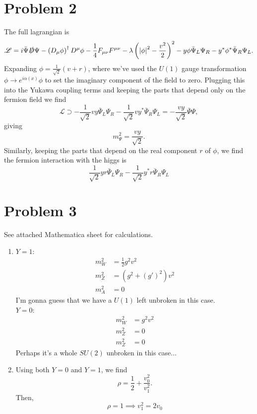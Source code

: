 \documentclass[12pt]{article}
\begin{document}
\section*{Problem 2}
The full lagrangian is
\[ \mathscr{L} = i\bar{\Psi}\slashed{D}\Psi - \left(D_\mu\phi\right)^\dag D^\mu\phi - \frac{1}{4}F_{\mu\nu}F^{\mu\nu} - \lambda\left(\abs{\phi}^2 - \frac{v^2}{2}\right)^2 - y\phi\bar{\Psi}_L\Psi_R - y^*\phi^*\bar{\Psi}_R\Psi_L. \]
Expanding $\phi = \frac{1}{\sqrt{2}}(v + r)$, where we've used the $U(1)$ gauge transformation $\phi \to e^{i\alpha(x)}\phi$ to set the imaginary component of the field to zero. Plugging this into the Yukawa coupling terms and keeping the parts that depend only on the fermion field we find
\[ \mathscr{L} \supset -\frac{1}{\sqrt{2}}vy\bar{\Psi}_L\Psi_R - \frac{1}{\sqrt{2}}vy^*\bar{\Psi}_R\Psi_L = -\frac{vy}{\sqrt{2}}\bar{\Psi}\Psi, \]
giving
\[ m_\Psi^2 = \frac{vy}{\sqrt{2}}. \]
Similarly, keeping the parts that depend on the real component $r$ of $\phi$, we find the fermion interaction with the higgs is
\[ \frac{1}{\sqrt{2}}yr\bar{\Psi}_L\Psi_R - \frac{1}{\sqrt{2}}y^*r\bar{\Psi}_R\Psi_L \]



\section*{Problem 3}
See attached Mathematica sheet for calculations.
\begin{enumerate}[label=(\alph*)]
    \item $Y=1$:
    \begin{align*}
        m_W^2 &= \frac{1}{2}g^2v^2 \\
        m_Z^2 &= (g^2 + (g')^2)v^2 \\
        m_A^2 &= 0
    \end{align*}
    I'm gonna guess that we have a $U(1)$ left unbroken in this case. \\
    $Y=0$:
    \begin{align*}
        m_W^2 &= g^2v^2 \\
        m_Z^2 &= 0 \\
        m_Z^2 &= 0
    \end{align*}
    Perhaps it's a whole $SU(2)$ unbroken in this case...

    \item Using both $Y=0$ and $Y=1$, we find
    \[ \rho = \frac{1}{2} + \frac{v_0^2}{v_1^2}. \]
    Then, 
    \[ \rho = 1 \implies v_1^2 = 2v_0\]
\end{enumerate}



\end{document}
